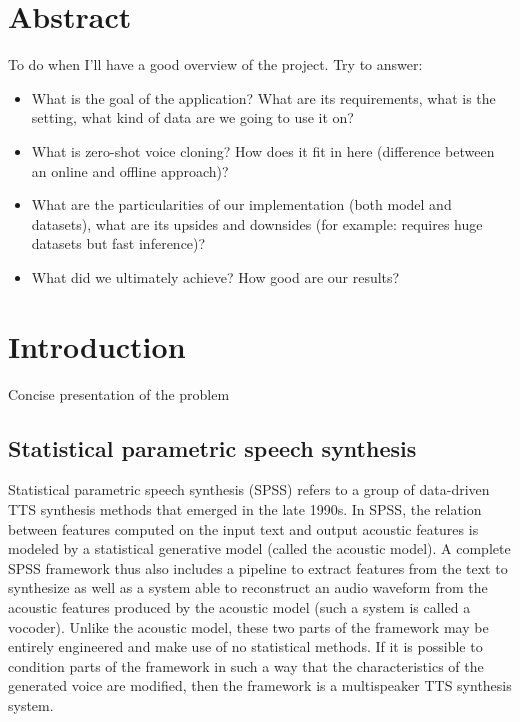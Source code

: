 \documentclass[a4paper, oneside]{article}
\begin{document}
\section{Abstract}
\color{red}
To do when I'll have a good overview of the project. Try to answer:
\begin{itemize}
	\item What is the goal of the application? What are its requirements, what is the setting, what kind of data are we going to use it on?
	\item What is zero-shot voice cloning? How does it fit in here (difference between an online and offline approach)?
	\item What are the particularities of our implementation (both model and datasets), what are its upsides and downsides (for example: requires huge datasets but fast inference)?
	\item What did we ultimately achieve? How good are our results?
\end{itemize}
\color{black}

\section{Introduction}

\color{red}
Concise presentation of the problem
\color{black}


\subsection{Statistical parametric speech synthesis}
Statistical parametric speech synthesis (SPSS) refers to a group of data-driven TTS synthesis methods that emerged in the late 1990s. In SPSS, the relation between features computed on the input text and output acoustic features is modeled by a statistical generative model (called the acoustic model). A complete SPSS framework thus also includes a pipeline to extract features from the text to synthesize as well as a system able to reconstruct an audio waveform from the acoustic features produced by the acoustic model (such a system is called a vocoder). Unlike the acoustic model, these two parts of the framework may be entirely engineered and make use of no statistical methods. If it is possible to condition parts of the framework in such a way that the characteristics of the generated voice are modified, then the framework is a multispeaker TTS synthesis system.
\end{document}
